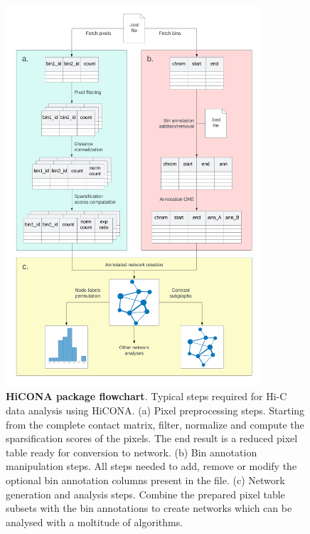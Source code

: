 \begin{figure}
  \centering
  \includegraphics[width=0.85\textwidth]{package_flowchart.png}
  \caption{\textbf{HiCONA package flowchart}. Typical steps required for Hi-C data analysis using HiCONA. (a) Pixel preprocessing steps. Starting from the complete contact matrix, filter, normalize and compute the sparsification scores of the pixels. The end result is a reduced pixel table ready for conversion to network. (b) Bin annotation manipulation steps. All steps needed to add, remove or modify the optional bin annotation columns present in the file. (c) Network generation and analysis steps. Combine the prepared pixel table subsets with the bin annotations to create networks which can be analysed with a moltitude of algorithms.}
  \label{fig:flowchart}
\end{figure}

